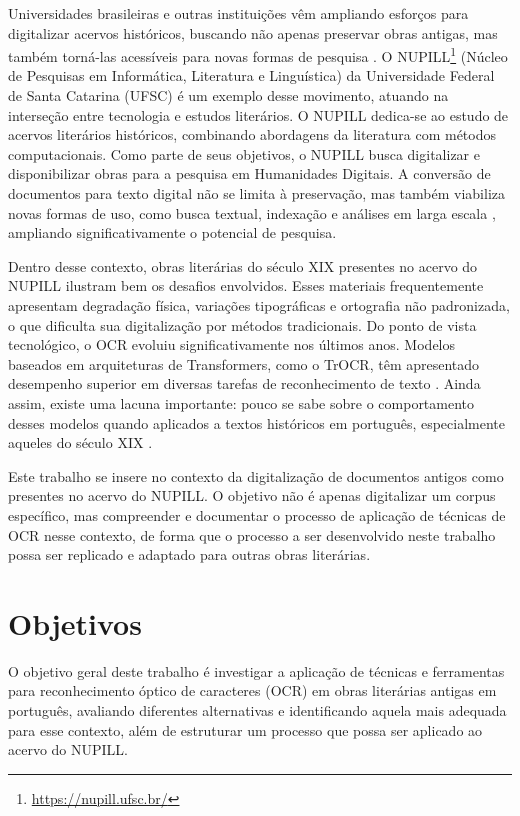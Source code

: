 \documentclass[
  12pt,
  oneside,
  a4paper,
  chapter=TITLE,
  section=TITLE,
  english,
  brazil
]{abntex2}
\begin{document}
Universidades brasileiras e outras instituições vêm ampliando esforços para digitalizar
acervos históricos, buscando não apenas preservar obras antigas, mas também torná-las
acessíveis para novas formas de pesquisa \cite{terras2013}. O
NUPILL\footnote{\url{https://nupill.ufsc.br/}} (Núcleo de Pesquisas em Informática,
Literatura e Linguística) da Universidade
Federal de Santa Catarina (UFSC) é um exemplo desse movimento, atuando na interseção
entre tecnologia e estudos literários.
O NUPILL dedica-se ao estudo de acervos literários históricos,
combinando abordagens da literatura com métodos computacionais. Como parte de seus
objetivos, o NUPILL busca digitalizar e disponibilizar obras 
para a pesquisa em Humanidades Digitais.
A conversão de documentos para texto digital não se limita à preservação, mas
também viabiliza novas formas de uso, como busca textual, indexação e análises em larga
escala \cite{burdick2012}, ampliando significativamente o potencial de pesquisa.


Dentro desse contexto, obras literárias do século XIX presentes no acervo do NUPILL
ilustram bem os desafios envolvidos. Esses materiais frequentemente apresentam
degradação física, variações tipográficas e ortografia não padronizada, o que dificulta
sua digitalização por métodos tradicionais.
Do ponto de vista tecnológico, o OCR evoluiu significativamente nos últimos anos.
Modelos baseados em arquiteturas de Transformers, como o TrOCR, têm apresentado
desempenho superior em diversas tarefas de reconhecimento de texto \cite{huang2021}.
Ainda assim, existe uma lacuna importante: pouco se sabe sobre o comportamento desses
modelos quando aplicados a textos históricos em português, especialmente aqueles do
século XIX \cite{smith2019}.

Este trabalho se insere no contexto da digitalização de documentos antigos como presentes no acervo do NUPILL. O objetivo não é apenas digitalizar um corpus
específico, mas compreender e documentar o processo de aplicação de técnicas de OCR
nesse contexto, de forma que o processo a ser desenvolvido neste trabalho possa ser replicado e adaptado para outras obras literárias.

\section{Objetivos}

O objetivo geral deste trabalho é investigar a aplicação de técnicas e ferramentas para reconhecimento óptico de
caracteres (OCR) em obras literárias antigas em português, avaliando diferentes
alternativas e identificando aquela mais adequada para esse contexto, além de estruturar
um processo que possa ser aplicado ao acervo do NUPILL.
\end{document}
